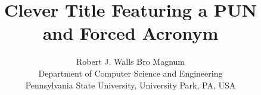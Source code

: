 \newcommand{\thetitle}{Clever Title Featuring a PUN \\ and Forced Acronym}
\newcommand{\pdftitle}{Clever Title Featuring a PUN and Forced Acronym}
\newcommand{\pdfauthors}{Robert J. Walls, Bro Magnum} 


\newcount\draft{} %

\newcommand{\sysname}{\textsc{Pun}\xspace}





\makeatletter
\def\@copyrightspace{\relax}
\makeatother

\title{\thetitle}
\author{Robert J. Walls \qquad Bro Magnum \\
Department of Computer Science and Engineering \\
Pennsylvania State University, University Park, PA, USA \\
\href{mailto:rjwalls@cse.psu.edu,bro@cse.psu.edu}
{}}
\maketitle







